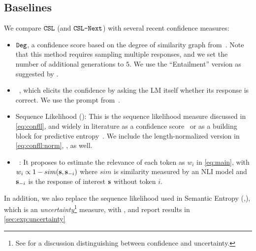 \subsection{Baselines}
We compare $\texttt{CSL}$ (and $\texttt{CSL-Next}$) with several recent confidence measures:
\begin{itemize}

    \item $\texttt{Deg}$, a confidence score based on the degree of similarity graph from~\citet{lin2023generating}.
    Note that this method requires sampling multiple responses, and we set the number of additional generations to $5$.
    We use the ``Entailment'' version as suggested by \citet{lin2023generating}.
    
    \item \baselinePTrue~\citep{kadavath2022language}, which elicits the confidence by asking the LM itself whether its response is correct.
    We use the prompt from~\citet{kadavath2022language,lin2023generating}. 

    \item Sequence Likelihood (\baselineNLL): 
    This is the sequence likelihood measure discussed in \cref{eq:confll}, and widely in literature as a confidence score~\cite{lin2023generating,quach2023conformal,huang2024uncertainty} or as a building block for predictive entropy~\citep{kuhn2023semantic,kadavath2022language,malinin2021uncertainty}.
    We include the length-normalized version in \cref{eq:confll:norm}, \baselineNLLNorm, as well.
    
    \item \baselineSAR~\citep{duan2023shifting}:
    It proposes to estimate the relevance of each token as $w_i$ in \cref{eq:main}, with $w_i\propto 1-sim(\mathbf{s}, \mathbf{s}_{-i})$ where $sim$ is similarity measured by an NLI model %
    and $\mathbf{s}_{-i}$ is the response of interest $\mathbf{s}$ without token $i$.

\end{itemize}
In addition, we also replace the sequence likelihood used in Semantic Entropy (\baselineSE,\citealp{kuhn2023semantic}), which is an \textit{uncertainty}\footnote{See \citet{lin2023generating} for a discussion distinguishing between confidence and uncertainty.} measure, with \methodnamePrompt, and report results in \cref{sec:exp:uncertainty}



